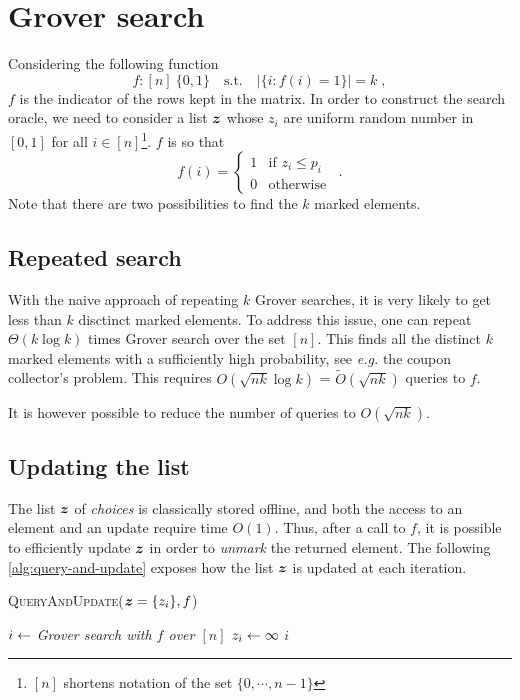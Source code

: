 \section{Grover search}
Considering the following function
\begin{equation*}
    f : [n] \> \{0, 1\} \quad \text{s.t.} \quad \big|\{i : f(i) = 1\}\big| = k \; ,
\end{equation*}
$f$ is the indicator of the rows kept in the matrix. In order to construct the
search oracle, we need to consider a list $\boldsymbol z$ whose $z_i$ are uniform random
number in $[0, 1]$ for all $i \in [n]$\footnote{$[n]$ shortens notation of the
set $ \{0, \cdots, n-1\}$}. $f$ is so that
\begin{equation} \label{eq:grover-oracle}
   f(i) = \begin{cases}
       1 & \text{if } z_i \leq p_i \\
       0 & \text{otherwise }
   \end{cases}\, .
\end{equation}
Note that there are two possibilities to find the $k$ marked elements.

\subsection{Repeated search}
With the naive approach of repeating $k$ Grover searches, it is very likely to
get less than $k$ disctinct marked elements. To address this issue, one can
repeat $\Theta(k \log k)$ times Grover search over the set $[n]$. This finds all
the distinct $k$ marked elements with a sufficiently high probability, see
\textit{e.g.} the coupon collector's problem. This requires $O(\sqrt{nk}\log k)$
= $\tilde O (\sqrt{nk})$ queries to $f$.

It is however possible to reduce the number of queries to $O(\sqrt{nk})$.

\subsection{Updating the list}
The list $\boldsymbol z$ of \textit{choices} is classically stored offline, and both the
access to an element and an update require time $O(1)$. Thus, after a call to
$f$, it is possible to efficiently update $\boldsymbol z$ in order to \textit{unmark}
the returned element. The following \autoref{alg:query-and-update} exposes how
the list $\boldsymbol z$ is updated at each iteration.

\begin{algorithm}[H]
    \caption{\textsc{QueryAndUpdate}($\boldsymbol z = \{z_i\}, f$)}
    \label{alg:query-and-update}
    \begin{algorithmic}[1]
        \State $i \leftarrow$ \textit{Grover search with $f$ over $[n]$}
        \State $z_i \leftarrow \infty$
        \State \Return $i$
    \end{algorithmic}
\end{algorithm}

